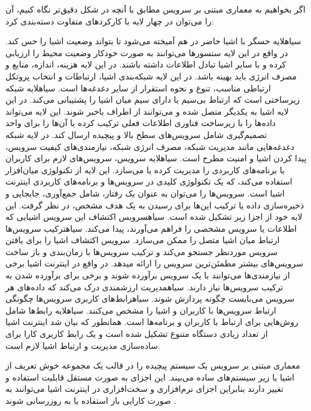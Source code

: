 اگر بخواهیم به معماری مبتنی بر سرویس مطابق با آنچه در شکل  دقیق‌تر نگاه کنیم، آن را می‌توان در چهار لایه با کارکردهای متفاوت دسته‌بندی کرد:

 ‌سیاه{لایه حسگر} با اشیا حاضر در هم آمیخته می‌شود تا بتواند وضعیت اشیا را حس کند. در واقع در این لایه سنسورها می‌توانند به صورت خودکار وضعیت محیط را ارزیابی کرده و با سایر اشیا تبادل اطلاعات داشته باشند.
در این لایه هزینه، اندازه، منابع و مصرف انرژی باید بهینه باشد. در این لایه شبکه‌بندی اشیا، ارتباطات و انتخاب پروتکل ارتباطی مناسب، تنوع و نحوه استقرار از سایر دغدغه‌ها است.
 ‌سیاه{لایه شبکه} زیرساختی است که ارتباط بی‌سیم یا دارای سیم میان اشیا را پشتیبانی می‌کند. در این لایه اشیا به یکدیگر متصل شده و می‌توانند از اطراف باخبر شوند. این لایه می‌تواند داده‌ها را با زیرساخت فناوری اطلاعات فعلی
ترکیب کرده یا آن‌ها را برای واحد تصمیم‌گیری شامل سرویس‌های سطح بالا و پیچیده ارسال کند. در لایه شبکه دغدغه‌هایی مانند مدیریت شبکه، مصرف انرژی شبکه، نیازمندی‌های کیفیت سرویس، پیدا کردن اشیا و امنیت مطرح است.
 ‌سیاه{لایه سرویس}، سرویس‌های لازم برای کاربران یا برنامه‌های کاربردی را مدیریت کرده یا می‌سازد. این لایه از تکنولوژی میان‌افزار استفاده می‌کند، که یک تکنولوژی کلیدی در سرویس‌ها و برنامه‌های کاربردی اینترنت اشیا است.
سرویس‌ها را می‌توان به عنوان یک رفتار، شامل جمع‌آوری، جابجایی و ذخیره‌سازی داده یا ترکیب این‌ها برای رسیدن به یک هدف مشخص، در نظر گرفت.
این لایه خود از اجزا زیر تشکیل شده است.
 ‌سیاه{سرویس اکتشاف} این سرویس اشیایی که اطلاعات یا سرویس مشخصی را فراهم می‌آورند، پیدا می‌کند.
 ‌سیاه{ترکیب سرویس‌ها} ارتباط میان اشیا متصل را ممکن می‌سازد. سرویس اکتشاف اشیا را برای یافتن سرویس موردنظر جستجو می‌کند و ترکیب سرویس‌ها با زمان‌بندی و باز ساخت سرویس‌های بیشتر مطمئن‌ترین سرویس را ارائه میدهد.
در واقع در اینترنت اشیا برخی از نیازمندی‌ها می‌توانند با یک سرویس برآورده شوند و برخی برای برآورده شدن به ترکیب سرویس‌ها نیاز دارند.
 ‌سیاه{مدیریت ارزشمندی} درک می‌کند که داده‌های هر سرویس می‌بایست چگونه پردازش شوند.
 ‌سیاه{رابط‌های کاربری سرویس‌ها} چگونگی ارتباط سرویس‌ها با کاربران و اشیا را مشخص می‌کنند.
 ‌سیاه{لایه رابط‌ها} شامل روش‌هایی برای ارتباط با کاربران و برنامه‌ها است. همانطور که بیان شد اینترنت اشیا از تعداد زیادی دستگاه متنوع تشکیل شده است و یک رابط کاربری کارا برای ساده‌سازی مدیریت و ارتباط اشیا لازم است.

معماری مبتنی بر سرویس یک سیستم پیچیده را در قالب یک مجموعه خوش تعریف از اشیا یا زیر سیستم‌های ساده می‌بیند.
این اجزای به صورت مستقل قابلیت استفاده و تغییر دارند بنابراین اجزای نرم‌افزاری و سخت‌افزاری در اینترنت اشیا می‌توانند به صورت کارایی
باز استفاده یا به روزرسانی شوند
.


